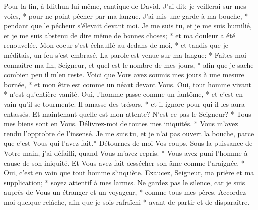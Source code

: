 Pour la fin, à Idithun lui-même, cantique de David.
J'ai dit: je veillerai sur mes voies, * pour ne point pécher par ma langue. J'ai mis une garde à ma bouche, * pendant que le pécheur s'élevait devant moi.
Je me suis tu, et je me suis humilié, et je me suis abstenu de dire même de bonnes choses; * et ma douleur a été renouvelée.
Mon coeur s'est échauffé au dedans de moi, * et tandis que je méditais, un feu s'est embrasé.
La parole est venue sur ma langue: * Faites-moi connaître ma fin, Seigneur, et quel est le nombre de mes jours, * afin que je sache combien peu il m'en reste.
Voici que Vous avez soumis mes jours à une mesure bornée, * et mon être est comme un néant devant Vous. Oui, tout homme vivant * n'est qu'entière vanité.
Oui, l'homme passe comme un fantôme, * et c'est en vain qu'il se tourmente. Il amasse des trésors, * et il ignore pour qui il les aura entassés.
Et maintenant quelle est mon attente? N'est-ce pas le Seigneur? * Tous mes biens sont en Vous.
Délivrez-moi de toutes mes iniquités. * Vous m'avez rendu l'opprobre de l'insensé.
Je me suis tu, et je n'ai pas ouvert la bouche, parce que c'est Vous qui l'avez fait.*
Détournez de moi Vos coups.
Sous la puissance de Votre main, j'ai défailli, quand Vous m'avez repris. * Vous avez puni l'homme à cause de son iniquité. Et Vous avez fait dessécher son âme comme l'araignée. * Oui, c'est en vain que tout homme s'inquiète.
Exaucez, Seigneur, ma prière et ma supplication; * soyez attentif à mes larmes. Ne gardez pas le silence, car je suis auprès de Vous un étranger et un voyageur, * comme tous mes pères.
Accordez-moi quelque relâche, afin que je sois rafraîchi * avant de partir et de disparaître.

